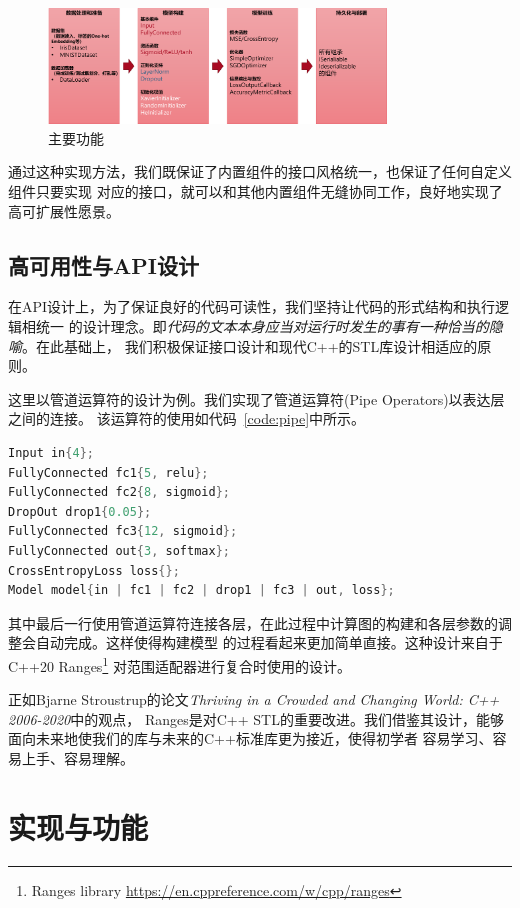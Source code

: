 \documentclass[a4paper,twoside,twocolumn]{article}
\begin{document}
\begin{spacing}{1.2}
\begin{figure}[htb]
	\centering
	\caption{主要功能}
	\label{fig:comps}
	\includegraphics[width=0.8\textwidth]{comps.png}
\end{figure}

通过这种实现方法，我们既保证了内置组件的接口风格统一，也保证了任何自定义组件只要实现
对应的接口，就可以和其他内置组件无缝协同工作，良好地实现了高可扩展性愿景。


\subsection{高可用性与API设计}

在API设计上，为了保证良好的代码可读性，我们坚持让代码的形式结构和执行逻辑相统一
的设计理念。即\emph{代码的文本本身应当对运行时发生的事有一种恰当的隐喻}。在此基础上，
我们积极保证接口设计和现代C++的STL库设计相适应的原则。

这里以管道运算符的设计为例。我们实现了管道运算符(Pipe Operators)以表达层之间的连接。
该运算符的使用如代码~\ref{code:pipe}中所示。

\begin{lstlisting}[language=c++,style=CppStyle,caption={管道运算符},label={code:pipe}]
Input in{4};
FullyConnected fc1{5, relu};
FullyConnected fc2{8, sigmoid};
DropOut drop1{0.05};
FullyConnected fc3{12, sigmoid};
FullyConnected out{3, softmax};
CrossEntropyLoss loss{};
Model model{in | fc1 | fc2 | drop1 | fc3 | out, loss};
\end{lstlisting}

其中最后一行使用管道运算符连接各层，在此过程中计算图的构建和各层参数的调整会自动完成。这样使得构建模型
的过程看起来更加简单直接。这种设计来自于C++20 Ranges\footnote{Ranges library \url{https://en.cppreference.com/w/cpp/ranges}}
对范围适配器进行复合时使用的设计。

正如Bjarne Stroustrup的论文\textit{Thriving in a Crowded and Changing World: C++ 2006-2020}中的观点\cite{stroustrup2020thriving}，
Ranges是对C++ STL的重要改进。我们借鉴其设计，能够面向未来地使我们的库与未来的C++标准库更为接近，使得初学者
容易学习、容易上手、容易理解。

\section{实现与功能}


\end{spacing}
\end{document}
